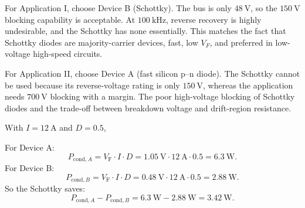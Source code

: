 \begin{solutionblock}
    For Application I, choose Device B (Schottky). The bus is only $\SI{48}{\volt}$, so the $\SI{150}{\volt}$ blocking capability is acceptable. 
    At $\SI{100}{\kilo\hertz}$, reverse recovery is highly undesirable, and the Schottky has none essentially. 
    This matches the fact that Schottky diodes are majority-carrier devices, fast, low $V_F$, and preferred in low-voltage high-speed circuits.

    For Application II, choose Device A (fast silicon p--n diode). 
    The Schottky cannot be used because its reverse-voltage rating is only $\SI{150}{\volt}$, whereas the application needs $\SI{700}{\volt}$ blocking 
    with a margin. The poor high-voltage blocking of Schottky diodes and the trade-off between breakdown voltage and drift-region resistance.
\end{solutionblock} 


\begin{solutionblock}
    With $I = \SI{12}{\ampere}$ and $D = 0.5$,

    For Device A:
    \begin{equation}
        P_{\mathrm{cond},A} = V_\mathrm{F} \cdot I \cdot D = \SI{1.05}{\volt} \cdot \SI{12}{\ampere} \cdot 0.5 = \SI{6.3}{\watt}.
    \end{equation}
    For Device B:
    \begin{equation}
        P_{\mathrm{cond},B} = V_\mathrm{F} \cdot I \cdot D = \SI{0.48}{\volt} \cdot \SI{12}{\ampere} \cdot 0.5 = \SI{2.88}{\watt}.
    \end{equation}
    So the Schottky saves:
    \begin{equation}
        P_{\mathrm{cond},A} - P_{\mathrm{cond},B} = \SI{6.3}{\watt} - \SI{2.88}{\watt} = \SI{3.42}{\watt}.
    \end{equation}
\end{solutionblock} 




